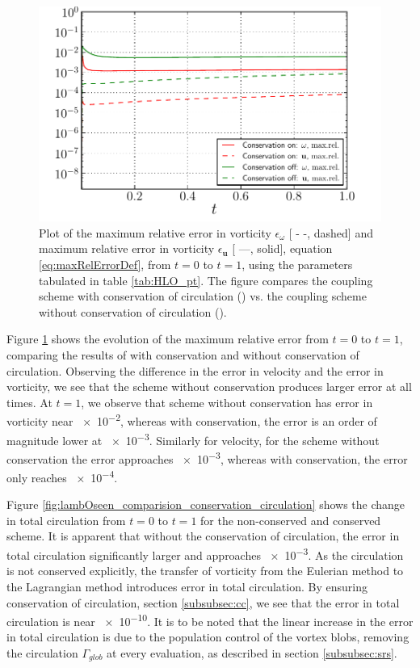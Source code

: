 	\begin{figure}[!p]
	\centering
	\includegraphics[width=0.6\linewidth]{./figures/hybrid/lambOseent2/lambOseen_comparision_conservation_compressed.pdf}
	\caption{Plot of the maximum relative error in vorticity $\epsilon_{\omega}$ [ - -, dashed] and maximum relative error in vorticity $\epsilon_{\mathbf{u}}$ [ ---, solid], equation \ref{eq:maxRelErrorDef}, from $t=0$ to $t=1$, using the parameters tabulated in table \ref{tab:HLO_pt}. The figure compares the coupling scheme with conservation of circulation ({}) vs. the coupling scheme without conservation of circulation ({}).}
	\label{fig:lambOseen_comparision_conservation}
	\end{figure}	

Figure \ref{fig:lambOseen_comparision_conservation} shows the evolution of the maximum relative error from $t=0$ to $t=1$, comparing the results of with conservation and without conservation of circulation. Observing the difference in the error in velocity and the error in vorticity, we see that the scheme without conservation produces larger error at all times. At $t=1$, we observe that scheme without conservation has error in vorticity near \num{e-2}, whereas with conservation, the error is an order of magnitude lower at \num{e-3}. Similarly for velocity, for the scheme without conservation the error approaches \num{e-3}, whereas with conservation, the error only reaches \num{e-4}. 

Figure \ref{fig:lambOseen_comparision_conservation_circulation} shows the change in total circulation from $t=0$ to $t=1$ for the non-conserved and conserved scheme. It is apparent that without the conservation of circulation, the error in total circulation significantly larger and approaches \num{e-3}. As the circulation is not conserved explicitly, the transfer of vorticity from the Eulerian method to the Lagrangian method introduces error in total circulation. By ensuring conservation of circulation, section \ref{subsubsec:cc}, we see that the error in total circulation is near \num{e-10}. It is to be noted that the linear increase in the error in total circulation is due to the population control of the vortex blobs, removing the circulation $\Gamma_{glob}$ at every evaluation, as described in section \ref{subsubsec:srs}.

